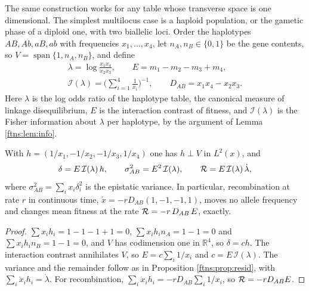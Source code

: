 The same construction works for any table whose transverse space is one dimensional. The simplest
multilocus case is a haploid population, or the gametic phase of a diploid one, with two biallelic
loci. Order the haplotypes $AB,Ab,aB,ab$ with frequencies $x_1,\dots,x_4$, let $n_A,n_B\in\{0,1\}$
be the gene contents, so $V=\operatorname{span}\{1,n_A,n_B\}$, and define
\begin{gather*}
\lambda=\log\frac{x_1x_4}{x_2x_3},\qquad
E=m_1-m_2-m_3+m_4,\\
\mathcal{I}(\lambda)=\Big(\sum_{i=1}^4\frac1{x_i}\Big)^{-1},\qquad
D_{AB}=x_1x_4-x_2x_3 .
\end{gather*}
Here $\lambda$ is the log odds ratio of the haplotype table, the canonical measure of linkage
disequilibrium, $E$ is the interaction contrast of fitness, and $\mathcal{I}(\lambda)$ is the
Fisher information about $\lambda$ per haplotype, by the argument of Lemma \ref{ftns:lem:info}.

\begin{proposition}
\label{ftns:prop:twolocus}
With $h=(1/x_1,-1/x_2,-1/x_3,1/x_4)$ one has $h\perp V$ in $L^2(x)$, and
\[
\delta=E\,\mathcal{I}(\lambda)\,h,\qquad \sigma^2_{AB}=E^2\,\mathcal{I}(\lambda),\qquad
\mathcal{R}=E\,\mathcal{I}(\lambda)\,\dot\lambda,
\]
where $\sigma^2_{AB}=\sum_ix_i\delta_i^2$ is the epistatic variance. In particular, recombination at
rate $r$ in continuous time, $\dot x=-rD_{AB}(1,-1,-1,1)$, moves no allele frequency and changes mean
fitness at the rate $\mathcal{R}=-r\,D_{AB}\,E$, exactly.
\end{proposition}

\begin{proof}
$\sum x_ih_i=1-1-1+1=0$, $\sum x_ih_in_A=1-1=0$ and $\sum x_ih_in_B=1-1=0$, and $V$ has codimension
one in $\mathbb{R}^4$, so $\delta=ch$. The interaction contrast annihilates $V$, so $E=c\sum_i1/x_i$
and $c=E\,\mathcal{I}(\lambda)$. The variance and the remainder follow as in
Proposition \ref{ftns:prop:resid}, with $\sum_i\dot x_ih_i=\dot\lambda$. For recombination,
$\sum_i\dot x_ih_i=-rD_{AB}\sum_i1/x_i$, so $\mathcal{R}=-rD_{AB}E$.
\end{proof}

